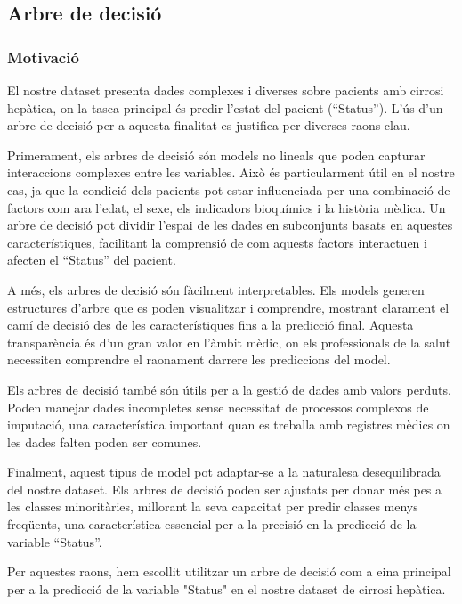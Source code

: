 \subsection{Arbre de decisió}

\subsubsection{Motivació}
El nostre dataset presenta dades complexes i diverses sobre pacients amb cirrosi hepàtica, on la tasca principal és predir l'estat del pacient (``Status''). L'ús d'un arbre de decisió per a aquesta finalitat es justifica per diverses raons clau.

Primerament, els arbres de decisió són models no lineals que poden capturar interaccions complexes entre les variables. Això és particularment útil en el nostre cas, ja que la condició dels pacients pot estar influenciada per una combinació de factors com ara l'edat, el sexe, els indicadors bioquímics i la història mèdica. Un arbre de decisió pot dividir l'espai de les dades en subconjunts basats en aquestes característiques, facilitant la comprensió de com aquests factors interactuen i afecten el ``Status'' del pacient.

A més, els arbres de decisió són fàcilment interpretables. Els models generen estructures d'arbre que es poden visualitzar i comprendre, mostrant clarament el camí de decisió des de les característiques fins a la predicció final. Aquesta transparència és d'un gran valor en l'àmbit mèdic, on els professionals de la salut necessiten comprendre el raonament darrere les prediccions del model.

Els arbres de decisió també són útils per a la gestió de dades amb valors perduts. Poden manejar dades incompletes sense necessitat de processos complexos de imputació, una característica important quan es treballa amb registres mèdics on les dades falten poden ser comunes.

Finalment, aquest tipus de model pot adaptar-se a la naturalesa desequilibrada del nostre dataset. Els arbres de decisió poden ser ajustats per donar més pes a les classes minoritàries, millorant la seva capacitat per predir classes menys freqüents, una característica essencial per a la precisió en la predicció de la variable ``Status''.

Per aquestes raons, hem escollit utilitzar un arbre de decisió com a eina principal per a la predicció de la variable "Status" en el nostre dataset de cirrosi hepàtica.
